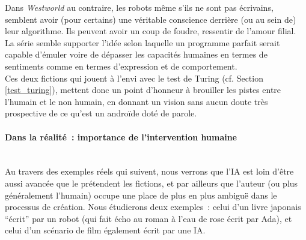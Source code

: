 \documentclass{article}
\newcommand{\subsubsubsection}[1]{\paragraph{#1}\mbox{}\\}
\begin{document}
					Dans \textit{Westworld} au contraire, les robots même s'ils ne sont pas écrivains, semblent avoir (pour certains) une véritable conscience derrière (ou au sein de) leur algorithme. Ils peuvent avoir un coup de foudre, ressentir de l'amour filial. La série semble supporter l'idée selon laquelle un programme parfait serait capable d'émuler voire de dépasser les capacités humaines en termes de sentiments comme en termes d'expression et de comportement.\\
					
					Ces deux fictions qui jouent à l'envi avec le test de Turing (cf. Section \ref{test_turing}), mettent donc un point d'honneur à brouiller les pistes entre l'humain et le non humain, en donnant un vision sans aucun doute très prospective de ce qu'est un androïde doté de parole.
					
					
					
				\subsubsubsection{Dans la réalité~: importance de l'intervention humaine}
					Au travers des exemples réels qui suivent, nous verrons que l'IA est loin d'être aussi avancée que le prétendent les fictions, et par ailleurs que l'auteur (ou plus généralement l'humain) occupe une place de plus en plus ambiguë dans le processus de création. Nous étudierons deux exemples~: celui d'un livre japonais ``écrit'' par un robot (qui fait écho au roman à l'eau de rose écrit par Ada), et celui d'un scénario de film également écrit par une IA.\\
					
\end{document}
